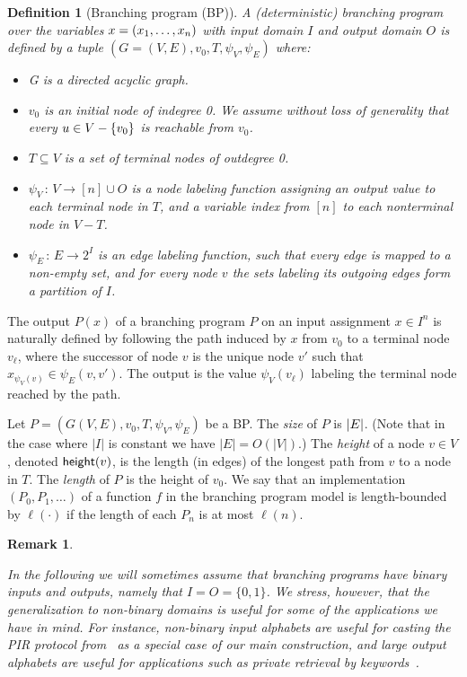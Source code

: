 \documentclass[11pt]{article}
\newcommand{\superparagraph}[1]{\medskip\noindent {\bf #1}}
\newtheorem{definition}[theorem]{Definition}
\newtheorem{Remark}[theorem]{Remark}
\newenvironment{remark}{\begin{Remark}\begin{rm}}{\end{rm}\end{Remark}}
\newcommand{\height}{{\sf height}}
\newcommand\bp{\mbox{BP}\xspace}
\newcommand{\mathify}[1]{\ifmmode{#1}\else\mbox{$#1$}\fi}
\newcommand{\set}[2][]{\mathify{{\left\{#2\right\}}^{#1}}}
\newcommand{\fnrngdom}[2]{#1\to#2}
\newcommand{\fndef}[3]{{#1\,:\,\fnrngdom{#2}{#3}}}
\newcommand{\emptyornot}[3]{\ifthenelse{\equal{#1}{}}{#2}{#3}}
\newcommand{\opbrange}[3][,]{#2#1\ldots#1#3}
\newcommand{\oprrange}[2][,]{#2#1\ldots}
\newcommand{\vars}[3][1]{\emptyornot{#3}{\oprrange[,]{{#2}_{#1}}}{\opbrange[,]{{#2}_{#1}}{{#2}_{#3}}}}
\newcommand{\commvars}{\vars{x}{n}}
\newcommand{\size}[1]{\mathify{\left| #1 \right|}}
\begin{document}
\begin{definition}[Branching program (\bp)]
A (deterministic) branching program over the variables $x
=(\commvars)$ with input domain $I$ and output domain $O$ is
defined by a tuple $(G=(V,E),v_0,T,\psi_V,\psi_E)$ where:
\begin{itemize}
\item G is a directed acyclic graph.
  \item   $v_0$ is an initial node of
indegree 0. We assume without loss of generality that every
$u\in{V-\set{v_0}}$ is reachable from $v_0$.
  \item $T\subseteq{V}$ is a set of terminal nodes of outdegree
0.
  \item $\fndef{\psi_V}{V}{[n]\cup{O}}$ is a node
labeling function assigning an output value to each terminal node
in $T$, and a variable index from $[n]$ to each nonterminal node in
$V-T$.
  \item $\fndef{\psi_E}{E}{2^I}$ is an
edge labeling function, such that every edge is mapped to a
non-empty set, and for every node $v$ the sets labeling its
outgoing edges form a partition of $I$.
\end{itemize}
\end{definition}

\superparagraph{\bp evaluation.} The output $P(x)$ of a branching
program $P$ on an input assignment $x\in I^n$ is naturally defined
by following the path induced by $x$ from $v_0$ to a terminal node
$v_\ell$, where the successor of node $v$ is the unique node $v'$
such that $x_{\psi_V(v)}\in \psi_E(v,v')$. The output is the value
$\psi_V(v_\ell)$ labeling the terminal node reached by the path.

\superparagraph{\bp complexity measures.} Let
$P=(G(V,E),v_0,T,\psi_V,\psi_E)$ be a \bp. The {\em size} of $P$ is
$\size{E}$. (Note that in the case where $|I|$ is constant we have
$|E|=O(|V|)$.) The {\em height} of a node $v\in{V}$, denoted
$\height(v)$, is the length (in edges) of the longest path from $v$
to a node in $T$. The {\em length} of $P$ is the height of $v_0$.
We say that an implementation $(P_0,P_1,\ldots)$ of a function $f$
in the branching program model is length-bounded by $\ell(\cdot)$
if the length of each $P_n$ is at most $\ell(n)$.

\begin{remark} In the following we will sometimes assume that
branching programs have binary inputs and outputs,
namely that $I=O=\{0,1\}$. We stress, however, that the
generalization to non-binary domains is useful for some of the
applications we have in mind. For instance, non-binary input
alphabets are useful for casting the PIR protocol from~\cite{KO97}
as a special case of our main construction, and large output
alphabets are useful for applications such as private retrieval by
keywords~\cite{CGN,FIPR05}.
\end{remark}
\end{document}
